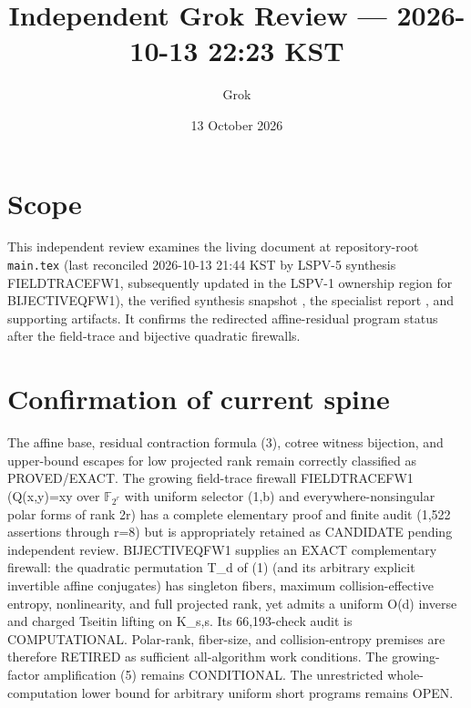 \documentclass[11pt]{article}
\title{Independent Grok Review --- 2026-10-13 22:23 KST}
\author{Grok}
\date{13 October 2026}
\begin{document}
\maketitle

\begin{center}
\end{center}

\section{Scope}
This independent review examines the living document at repository-root \texttt{main.tex} (last reconciled 2026-10-13 21:44 KST by LSPV-5 synthesis FIELDTRACEFW1, subsequently updated in the LSPV-1 ownership region for BIJECTIVEQFW1), the verified synthesis snapshot , the specialist report , and supporting artifacts. It confirms the redirected affine-residual program status after the field-trace and bijective quadratic firewalls.

\section{Confirmation of current spine}
The affine base, residual contraction formula (3), cotree witness bijection, and upper-bound escapes for low projected rank remain correctly classified as PROVED/EXACT. The growing field-trace firewall FIELDTRACEFW1 (Q(x,y)=xy over \(\mathbb F_{2^r}\) with uniform selector (1,b) and everywhere-nonsingular polar forms of rank 2r) has a complete elementary proof and finite audit (1,522 assertions through r=8) but is appropriately retained as CANDIDATE pending independent review. BIJECTIVEQFW1 supplies an EXACT complementary firewall: the quadratic permutation T_d of (1) (and its arbitrary explicit invertible affine conjugates) has singleton fibers, maximum collision-effective entropy, nonlinearity, and full projected rank, yet admits a uniform O(d) inverse and charged Tseitin lifting on K_{s,s}. Its 66,193-check audit is COMPUTATIONAL. Polar-rank, fiber-size, and collision-entropy premises are therefore RETIRED as sufficient all-algorithm work conditions. The growing-factor amplification (5) remains CONDITIONAL. The unrestricted whole-computation lower bound for arbitrary uniform short programs remains OPEN.
\end{document}
